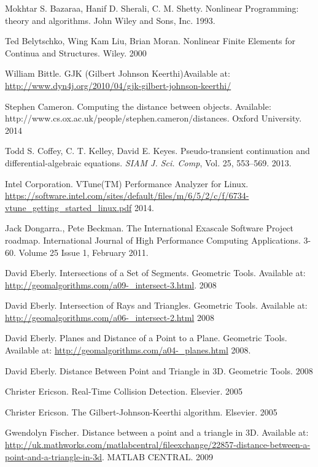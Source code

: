 \documentclass[times,12pt]{ACME2015article}
\begin{document}
\begin{thebibliography}{99}


Mokhtar S. Bazaraa, Hanif D. Sherali, C. M. Shetty. Nonlinear Programming: theory and algorithms. John Wiley and Sons, Inc. 1993.

Ted Belytschko, Wing Kam Liu, Brian Moran. Nonlinear Finite Elements for Continua and Structures. Wiley. 2000

William Bittle. GJK (Gilbert Johnson Keerthi)Available at: \url{http://www.dyn4j.org/2010/04/gjk-gilbert-johnson-keerthi/}


Stephen Cameron. Computing the distance between objects. Available: http://www.cs.ox.ac.uk/people/stephen.cameron/distances. Oxford University. 2014

Todd S. Coffey, C. T. Kelley, David E. Keyes. Pseudo-transient continuation and differential-algebraic equations. {\em SIAM J. Sci. Comp}, Vol. 25, 553--569. 2013.

Intel Corporation. VTune(TM) Performance Analyzer for Linux. \url{https://software.intel.com/sites/default/files/m/6/5/2/c/f/6734-vtune_getting_started_linux.pdf} 2014. 

Jack Dongarra., Pete Beckman. The International Exascale Software Project roadmap. International Journal of High Performance Computing Applications. 3-60. Volume 25 Issue 1, February 2011.

David Eberly. Intersections of a Set of Segments. Geometric Tools. Available at: \url{http://geomalgorithms.com/a09-_intersect-3.html}. 2008

David Eberly. Intersection of Rays and Triangles. Geometric Tools. Available at: \url{http://geomalgorithms.com/a06-_intersect-2.html} 2008

David Eberly. Planes and Distance of a Point to a Plane. Geometric Tools. Available at: \url{http://geomalgorithms.com/a04-_planes.html} 2008.

David Eberly. Distance Between Point and Triangle in 3D. Geometric Tools. 2008

Christer Ericson. Real-Time Collision Detection. Elsevier. 2005

Christer Ericson. The Gilbert-Johnson-Keerthi algorithm. Elsevier. 2005

Gwendolyn Fischer. Distance between a point and a triangle in 3D. Available at: \url{http://uk.mathworks.com/matlabcentral/fileexchange/22857-distance-between-a-point-and-a-triangle-in-3d}. MATLAB CENTRAL. 2009


\end{thebibliography}
\end{document}
